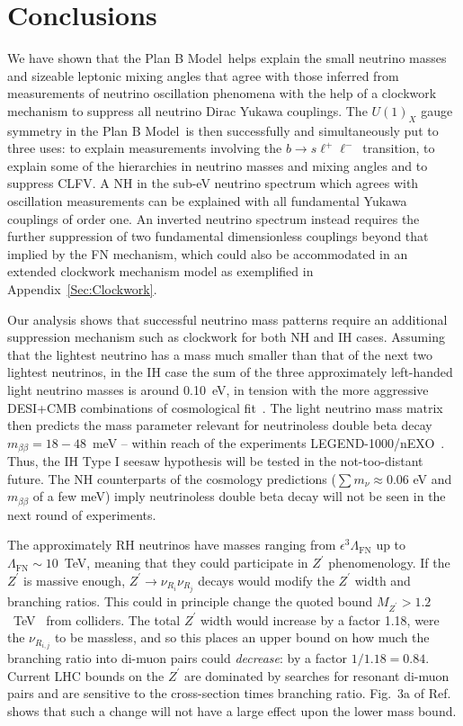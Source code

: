 \documentclass[11pt,letterpaper]{article}
\newcommand{\model}{Plan B Model}
\newcommand{\bsll}{$b \rightarrow s \ell^+ \ell^-$}
\begin{document}
\section{Conclusions}\label{sec:conc}
We have shown that the \model\ helps explain the small neutrino masses and
sizeable leptonic mixing angles that agree with those inferred from
measurements of neutrino oscillation phenomena with the help of a clockwork
mechanism to suppress all neutrino Dirac Yukawa couplings.
The $U(1)_X$ gauge symmetry in the \model\ is then successfully and
simultaneously put to three uses: to explain measurements involving the \bsll\ transition, to explain some of the hierarchies in neutrino masses and mixing angles and to suppress CLFV\@. 
A NH in the sub-eV neutrino spectrum which agrees with
oscillation measurements can be explained with all fundamental Yukawa
couplings of order one.  
An inverted neutrino spectrum instead requires the further suppression of two
fundamental dimensionless couplings beyond that implied by the FN mechanism, which
could also be accommodated in an extended clockwork mechanism model as exemplified in Appendix~\ref{Sec:Clockwork}.

Our analysis shows that successful neutrino mass patterns require an
additional suppression mechanism such as clockwork for both NH and IH cases. 
Assuming that the lightest neutrino has a mass much smaller than that of the
next two lightest neutrinos,
in the IH case the sum of the three
approximately left-handed light neutrino masses is around 0.10~eV, in tension
with the more aggressive DESI+CMB 
combinations of cosmological
fit~\cite{collaboration_desi_2025}.
The light neutrino mass matrix then predicts the mass parameter relevant for
neutrinoless double beta decay
$m_{\beta\beta}=18-48$~meV -- within reach of the experiments
LEGEND-1000/nEXO~\cite{collaboration_search_2023,collaboration_legend-1000_2021,collaboration_nexo_2022}. Thus, the IH Type I seesaw hypothesis will be
tested in the not-too-distant future. The NH counterparts of the cosmology
predictions ($\sum m_\nu \approx 0.06$ eV and $m_{\beta\beta}$ of a few meV)
imply
neutrinoless double beta decay will not be seen in the next round of
experiments. 

The approximately RH neutrinos have masses ranging from $\epsilon^3
\Lambda_{\text{FN}}$ up to $\Lambda_{\text{FN}}\sim 10$~TeV, meaning
that they could participate in $Z^\prime$ phenomenology. If the $Z^\prime$ is
massive enough, $Z^\prime \rightarrow \nu_{R_i} \nu_{R_j}$ decays would
modify the $Z^\prime$ width and branching ratios. This could in principle
change the quoted bound $M_{Z^\prime}>1.2$~TeV~\cite{Allanach:2024jls} from
colliders.
The total $Z^\prime$ width would increase by a factor 1.18, were the
$\nu_{R_{i,j}}$ to be massless, and so this places an upper bound on how much the
branching ratio into di-muon pairs could \emph{decrease}: by a factor
$1/1.18=0.84$. Current 
LHC bounds on the $Z^\prime$ are dominated by
searches for resonant di-muon pairs and are sensitive to the cross-section
times branching ratio. Fig.~3a of Ref.~\cite{Allanach:2024jls} shows that such
a change will not have a large effect upon the lower mass bound.
\end{document}
